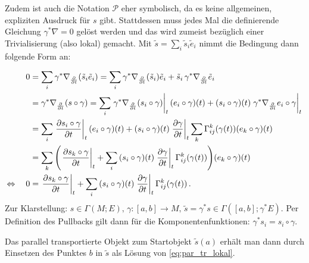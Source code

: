 Zudem ist auch die Notation $\mathcal{P}$ eher symbolisch, da es keine allgemeinen, expliziten Ausdruck für $s$ gibt. Stattdessen muss jedes Mal die definierende Gleichung $\gamma^* \nabla = 0$ gelöst werden und das wird zumeist bezüglich einer Trivialisierung (also lokal) gemacht. Mit $\tilde{s} = \sum_i \tilde{s}_i \tilde{e}_i$ nimmt die Bedingung dann folgende Form an:
\iffalse
Für $\tilde{s} = \sum_i \tilde{s}_i \tilde{e}_i$ ergibt sich folgende lokale Darstellung der Parallelitätsbedingung:
\begin{align*}
0 &= \gamma^* \nabla \tilde{s} = \sum_i \gamma^* \nabla \qty(\tilde{s}_i \tilde{e}_i) = \sum_i \gamma^* \nabla \qty(\tilde{s}_i) \tilde{e}_i + \tilde{s}_i \gamma^* \nabla \tilde{e}_i \, .
\end{align*}
Wird nun speziell in Richtung $\pdv{t}$ abgeleitet, so ergibt sich für $\tilde{s} = \gamma^* s$:
\fi
\begin{align}
0 &= \sum_i \gamma^* \nabla_{\pdv{t}} \qty(\tilde{s}_i \tilde{e}_i) = \sum_i \gamma^* \nabla_{\pdv{t}} \qty(\tilde{s}_i) \tilde{e}_i + \tilde{s}_i \, \gamma^* \nabla_{\pdv{t}} \tilde{e}_i
\notag\\
&= \gamma^* \nabla_{\pdv{t}} \qty(s \circ \gamma) = \sum_i \eval{\gamma^* \nabla_{\pdv{t}} \qty(s_i \circ \gamma)}_t \qty(e_i \circ \gamma)(t) + \qty(s_i \circ \gamma)(t) \eval{\gamma^* \nabla_{\pdv{t}} e_i \circ \gamma}_t
\notag\\
&= \sum_i \eval{\pdv{s_i \circ \gamma}{t}}_t \qty(e_i \circ \gamma)(t) + \qty(s_i \circ \gamma)(t) \eval{\pdv{\gamma}{t}}_t \sum_k \Gamma_{ij}^k(\gamma(t)) \qty(e_k \circ \gamma)(t)
\notag\\
&= \sum_k \qty(\eval{\pdv{s_k \circ \gamma}{t}}_t + \sum_i \qty(s_i \circ \gamma)(t) \eval{\pdv{\gamma}{t}}_t \Gamma_{ij}^k(\gamma(t))) \qty(e_k \circ \gamma)(t)
\notag\\
\Leftrightarrow \quad 0 &= \eval{\pdv{s_k \circ \gamma}{t}}_t + \sum_i \qty(s_i \circ \gamma)(t) \eval{\pdv{\gamma}{t}}_t \Gamma_{ij}^k(\gamma(t)) \, .
\label{eq:par_tr_lokal}
\end{align}
Zur Klarstellung: $s \in \Gamma(M; E), \, \gamma: [a, b] \rightarrow M, \, \tilde{s} = \gamma^* s \in \Gamma([a, b]; \gamma^* E)$. Per Definition des Pullbacks gilt dann für die Komponentenfunktionen: $\gamma^* s_i = s_i \circ \gamma$.


Das parallel transportierte Objekt zum Startobjekt $\tilde{s}(a)$ erhält man dann durch Einsetzen des Punktes $b$ in $\tilde{s}$ als Lösung von \eqref{eq:par_tr_lokal}.



